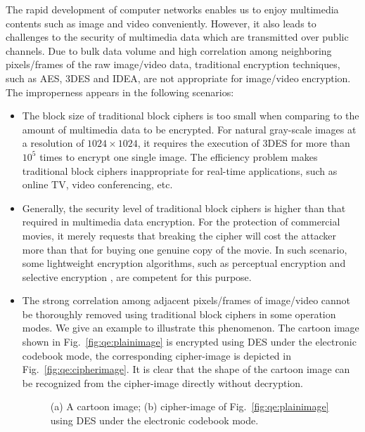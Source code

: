 \documentclass[smallextended, final]{svjour3}          \smartqed
\newlength\imagewidth
\begin{document}
{The rapid development of computer networks enables us to enjoy multimedia contents such as image and video conveniently.
However, it also leads to challenges to the security of multimedia data which are transmitted over public channels.}
Due to bulk data volume and high correlation among neighboring pixels/frames of the raw image/video data,
traditional encryption techniques, such as AES, 3DES and IDEA, are not appropriate for {image/video} encryption.
The improperness appears in the following scenarios:
\begin{itemize}
\item The block size of traditional block ciphers is too small when comparing to the amount of multimedia data to be
encrypted. For natural gray-scale images at a resolution of $1024\times 1024$, it requires the execution of 3DES for more than $10^5$ times to encrypt
one single image. The efficiency problem makes traditional block ciphers inappropriate for real-time applications, such as online TV,
video conferencing, etc.
\item Generally, the security level of traditional block ciphers is higher than that required in multimedia data encryption.
For the protection of commercial movies, it merely requests that breaking the cipher will cost the attacker more than that for buying one genuine copy of the movie.
In such scenario, some lightweight encryption algorithms, such as perceptual encryption \cite{li2007design} and selective encryption \cite{kim2011selective}, are
competent for this purpose.
\item The strong correlation among adjacent pixels/frames of image/video cannot be thoroughly removed using traditional block ciphers in some operation modes.
We give an example to illustrate this phenomenon. The cartoon image shown in Fig.~\ref{fig:qe:plainimage} is encrypted using DES under the electronic codebook mode,
the corresponding cipher-image is depicted in Fig.~\ref{fig:qe:cipherimage}.
It is clear that the shape of the cartoon image can be recognized from the cipher-image directly without decryption.

\begin{figure}[!htb]
\centering
\subfigure[]{
    \label{fig:qe:plainimage}
    \begin{minipage}[t]{\imagewidth}
    \centering
    \texttt{[image: qe]}
    \end{minipage}}
\caption{
(a) A cartoon image;
(b) cipher-image of Fig.~\ref{fig:qe:plainimage} using DES under the electronic codebook mode.}
\label{fig:qe}
\end{figure}

\end{itemize}
\end{document}

